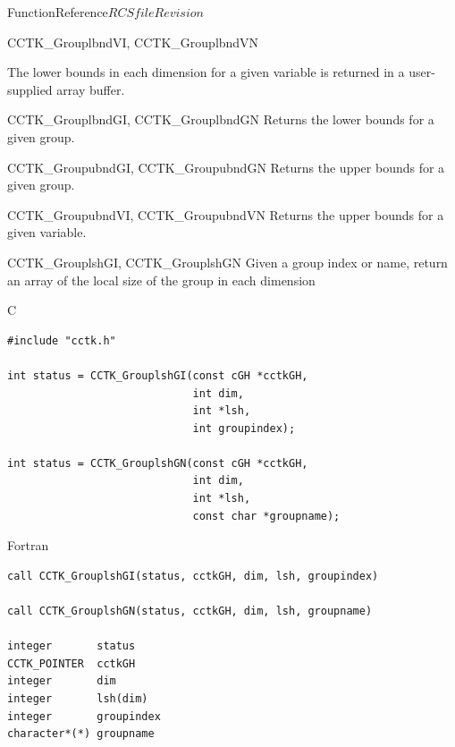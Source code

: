 \begin{cactuspart}{FunctionReference}{$RCSfile$}{$Revision$}
\begin{FunctionDescription}{CCTK\_GrouplbndVI, CCTK\_GrouplbndVN}
\begin{Discussion}
The lower bounds in each dimension for a given variable is returned in a user-supplied array buffer.
\end{Discussion}

\begin{SeeAlsoSection}
\begin{SeeAlso}{CCTK\_GrouplbndGI, CCTK\_GrouplbndGN}
Returns the lower bounds for a given group.
\end{SeeAlso}
\begin{SeeAlso}{CCTK\_GroupubndGI, CCTK\_GroupubndGN}
Returns the upper bounds for a given group.
\end{SeeAlso}
\begin{SeeAlso}{CCTK\_GroupubndVI, CCTK\_GroupubndVN}
Returns the upper bounds for a given variable.
\end{SeeAlso}
\end{SeeAlsoSection}

\end{FunctionDescription}


\begin{FunctionDescription}{CCTK\_GrouplshGI, CCTK\_GrouplshGN}
\label{CCTK-GrouplshGI}
\label{CCTK-GrouplshGN}
Given a group index or name, return an array of the local size of the group in each dimension

\begin{SynopsisSection}
\begin{Synopsis}{C}
\begin{verbatim}
#include "cctk.h"

int status = CCTK_GrouplshGI(const cGH *cctkGH,
                             int dim,
                             int *lsh,
                             int groupindex);

int status = CCTK_GrouplshGN(const cGH *cctkGH,
                             int dim,
                             int *lsh,
                             const char *groupname);
\end{verbatim}
\end{Synopsis}
\begin{Synopsis}{Fortran}
\begin{verbatim}
call CCTK_GrouplshGI(status, cctkGH, dim, lsh, groupindex)

call CCTK_GrouplshGN(status, cctkGH, dim, lsh, groupname)

integer       status
CCTK_POINTER  cctkGH
integer       dim
integer       lsh(dim)
integer       groupindex
character*(*) groupname
\end{verbatim}
\end{Synopsis}
\end{SynopsisSection}


\end{FunctionDescription}
\end{cactuspart}
